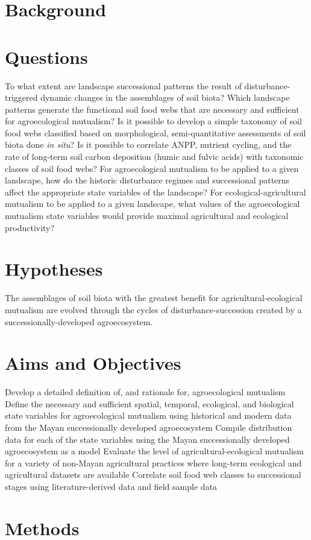 
\section{Background}

\section{Questions}
\begin{outline}
\1 To what extent are landscape successional patterns the result of disturbance-triggered dynamic changes in the assemblages of soil biota?
\1 Which landscape patterns generate the functional soil food webs that are necessary and sufficient for agroecological mutualism?
\1 Is it possible to develop a simple taxonomy of soil food webs classified based on morphological, semi-quantitative assessments of soil biota done \textit{in situ}?
\1 Is it possible to correlate ANPP, nutrient cycling, and the rate of long-term soil carbon deposition (humic and fulvic acids) with taxonomic classes of soil food webs?
\1 For agroecological mutualism to be applied to a given landscape, how do the historic disturbance regimes and successional patterns affect the appropriate state variables of the landscape?
\1 For ecological-agricultural mutualism to be applied to a given landscape, what values of the agroecological mutualism state variables would provide maximal agricultural and ecological productivity?

\end{outline}


\section{Hypotheses}
The assemblages of soil biota with the greatest benefit for agricultural-ecological mutualism are evolved through the cycles of disturbance-succession created by a successionally-developed agroecosystem.

\section{Aims and Objectives}
\begin{outline}
\1 Develop a detailed definition of, and rationale for, agroecological mutualism
\1 Define the necessary and sufficient spatial, temporal, ecological, and biological state variables for agroecological mutualism using historical and modern data from the Mayan successionally developed agroecosystem
\1 Compile distribution data for each of the state variables using the Mayan successionally developed agroecosystem as a model
\1 Evaluate the level of agricultural-ecological mutualism for a variety of non-Mayan agricultural practices where long-term ecological and agricultural datasets are available
\1 Correlate soil food web classes to successional stages using literature-derived data and field sample data
\end{outline}

\section{Methods}
